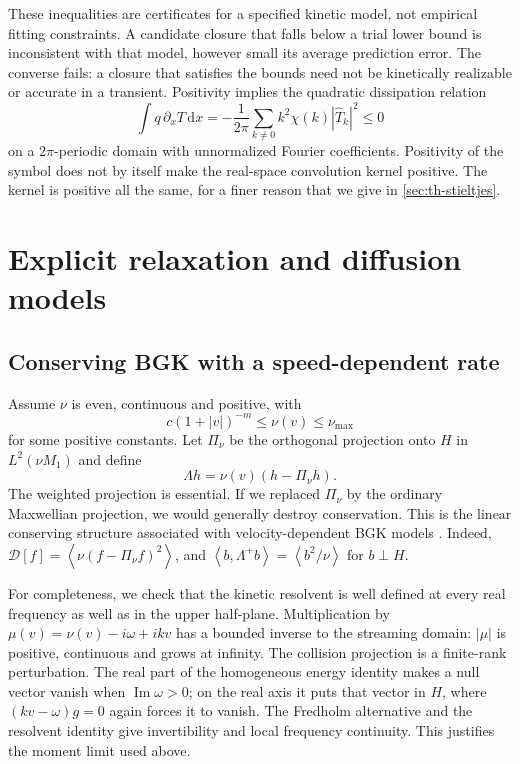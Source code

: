 \documentclass[11pt]{article}
\newcommand{\dd}{\,\mathrm d}
\newcommand{\av}[1]{\left\langle #1\right\rangle}
\newcommand{\D}{\mathcal D}
\newcommand{\Imag}{\operatorname{Im}}
\theoremstyle{definition}
\theoremstyle{remark}
\numberwithin{equation}{section}
\begin{document}
These inequalities are certificates for a specified kinetic model, not
empirical fitting constraints. A candidate closure that falls below a
trial lower bound is inconsistent with that model, however small its
average prediction error. The converse fails: a closure that satisfies the bounds need not be
kinetically realizable or accurate in a transient.
Positivity implies the quadratic dissipation relation
\[
 \int q\,\partial_xT\dd x
  =-\frac{1}{2\pi}\sum_{k\ne0} k^2\chi(k)|\widehat T_k|^2\leq0
\]
on a $2\pi$-periodic domain with unnormalized Fourier coefficients.
Positivity of the symbol does not by itself make the real-space
convolution kernel positive. The kernel is positive all the same, for a
finer reason that we give in \cref{sec:th-stieltjes}.

\section{Explicit relaxation and diffusion models}\label{sec:models}

\subsection{Conserving BGK with a speed-dependent rate}

Assume $\nu$ is even, continuous and positive, with
\begin{equation}
 c(1+|v|)^{-m}\leq\nu(v)\leq\nu_{\max}
 \label{eq:nuass}
\end{equation}
for some positive constants. Let $\Pi_\nu$ be the orthogonal projection
onto $H$ in $L^2(\nu M_1)$ and define
\begin{equation}
 \Lambda h=\nu(v)(h-\Pi_\nu h).
 \label{eq:vbgk}
\end{equation}
The weighted projection is essential. If we replaced $\Pi_\nu$ by the
ordinary Maxwellian projection, we would generally destroy conservation.
This is the linear conserving structure associated with
velocity-dependent BGK models \cite{Struchtrup1997}.
Indeed,
$\D[f]=\av{\nu(f-\Pi_\nu f)^2}$, and
$\av{b,\Lambda^+b}=\av{b^2/\nu}$ for $b\perp H$.

For completeness, we check that the kinetic resolvent is well defined at
every real frequency as well as in the upper half-plane. Multiplication by
$\mu(v)=\nu(v)-i\omega+ikv$ has a bounded inverse to the streaming domain:
$|\mu|$ is positive, continuous and grows at infinity.
The collision projection is a finite-rank perturbation.
The real part of the homogeneous energy identity makes a null vector
vanish when $\Imag\omega>0$; on the real axis it puts that vector in $H$,
where $(kv-\omega)g=0$ again forces it to vanish.
The Fredholm alternative and the resolvent identity give invertibility
and local frequency continuity. This justifies the moment limit used above.
\end{document}

